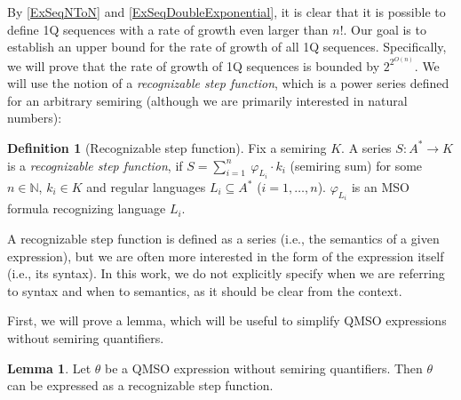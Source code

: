 \documentclass[en]{pracamgr}
\theoremstyle{definition}
\newtheorem{definition}{Definition}[section]
\newtheorem{lemma}[theorem]{Lemma}
\begin{document}
By \cref{ExSeqNToN} and \cref{ExSeqDoubleExponential}, it is clear that it is possible to define 1Q sequences with a rate of growth even larger than $n!$. Our goal is to establish an upper bound for the rate of growth of all 1Q sequences. Specifically, we will prove that the rate of growth of 1Q sequences is bounded by $2^{2^{O(n)}}$. We will use the notion of a \emph{recognizable step function}, which is a power series defined for an arbitrary semiring (although we are primarily interested in natural numbers):

\begin{definition}[Recognizable step function]
    \label{DefRecStepFun}
    Fix a semiring $K$.
    A series $S: A^* \rightarrow K$ is a \emph{recognizable step function}, if $S = \sum_{i = 1}^{n} \ \varphi_{L_i} \cdot k_i$ (semiring sum) for some $n \in \mathbb{N}$, $k_i \in K$ and regular languages $L_i \subseteq A^*$ ($i=1,\ldots,n$). $\varphi_{L_i}$ is an MSO formula recognizing language $L_i$.
\end{definition}

A recognizable step function is defined as a series (i.e., the semantics of a given expression), but we are often more interested in the form of the expression itself (i.e., its syntax). In this work, we do not explicitly specify when we are referring to syntax and when to semantics, as it should be clear from the context.

First, we will prove a lemma, which will be useful to simplify QMSO expressions without semiring quantifiers.

\begin{lemma}
    \label{QFreeRecognizable}
    Let $\theta$ be a QMSO expression without semiring quantifiers. Then $\theta$ can be expressed as a recognizable step function.
\end{lemma}
\end{document}

